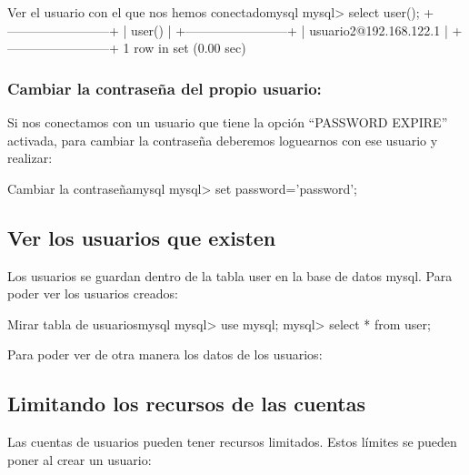 \begin{mycode}{Ver el usuario con el que nos hemos conectado}{mysql}{}
mysql> select user();
+------------------------+
| user()                 |
+------------------------+
| usuario2@192.168.122.1 |
+------------------------+
1 row in set (0.00 sec)
\end{mycode}


\subsubsection*{Cambiar la contraseña del propio usuario:}
Si nos conectamos con un usuario que tiene la opción “PASSWORD EXPIRE” activada, para cambiar la contraseña deberemos loguearnos con ese usuario y realizar:

\begin{mycode}{Cambiar la contraseña}{mysql}{}
mysql> set password='password';
\end{mycode}


\subsection{Ver los usuarios que existen}
Los usuarios se guardan dentro de la tabla user en la base de datos mysql. Para poder ver los usuarios creados:

\begin{mycode}{Mirar tabla de usuarios}{mysql}{}
mysql> use mysql;
mysql> select * from user;
\end{mycode}


Para poder ver de otra manera los datos de los usuarios:




\subsection{Limitando los recursos de las cuentas}
Las cuentas de usuarios pueden tener recursos limitados. Estos límites se pueden poner al crear un usuario:

